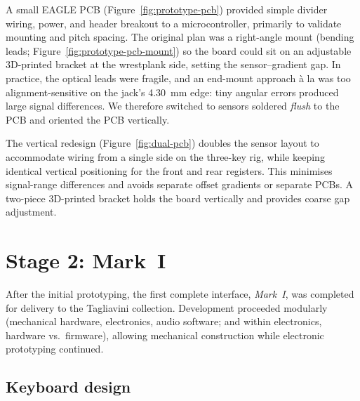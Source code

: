 A small EAGLE PCB (Figure~\ref{fig:prototype-pcb}) provided simple divider wiring, power, and header breakout to a microcontroller, primarily to validate mounting and pitch spacing. The original plan was a right-angle mount (bending leads; Figure~\ref{fig:prototype-pcb-mount}) so the board could sit on an adjustable 3D-printed bracket at the wrestplank side, setting the sensor–gradient gap. In practice, the optical leads were fragile, and an end-mount approach à la \textcite{mcpherson_portable_2013} was too alignment-sensitive on the jack’s 4.30~mm edge: tiny angular errors produced large signal differences. We therefore switched to sensors soldered \emph{flush} to the PCB and oriented the PCB vertically.


The vertical redesign (Figure~\ref{fig:dual-pcb}) doubles the sensor layout to accommodate wiring from a single side on the three-key rig, while keeping identical vertical positioning for the front and rear registers. This minimises signal-range differences and avoids separate offset gradients or separate PCBs. A two-piece 3D-printed bracket holds the board vertically and provides coarse gap adjustment.

\section{Stage 2: Mark~I}\label{sec:mark-1}

After the initial prototyping, the first complete interface, \emph{Mark~I}, was completed for delivery to the Tagliavini collection. Development proceeded modularly (mechanical hardware, electronics, audio software; and within electronics, hardware vs.\ firmware), allowing mechanical construction while electronic prototyping continued. 

\subsection{Keyboard design}

